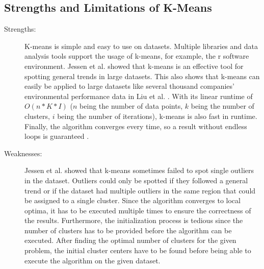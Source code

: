 \subsection{Strengths and Limitations of K-Means}
\begin{description}
    \item[Strengths:]
    K-means is simple and easy to use on datasets.
    Multiple libraries and data analysis tools support the usage of k-means, for example, the r software environment.
    Jessen et al. \cite{JES-IND} showed that k-means is an effective tool for spotting general trends in large datasets.
    This also shows that k-means can easily be applied to large datasets like several thousand companies' environmental performance data in Liu et al. \cite{LIU-BDE}.
    With its linear runtime of $O(n * K * I)$ ($n$ being the number of data points, $k$ being the number of clusters, $i$ being the number of iterations), k-means is also fast in runtime.
    Finally, the algorithm converges every time, so a result without endless loops is guaranteed \cite{SEL-GCT}.
    \item[Weaknesses:]
    Jessen et al. \cite{JES-IND} showed that k-means sometimes failed to spot single outliers in the dataset.
    Outliers could only be spotted if they followed a general trend or if the dataset had multiple outliers in the same region that could be assigned to a single cluster.
    Since the algorithm converges to local optima, it has to be executed multiple times to ensure the correctness of the results.
    Furthermore, the initialization process is tedious since the number of clusters has to be provided before the algorithm can be executed.
    After finding the optimal number of clusters for the given problem, the initial cluster centers have to be found before being able to execute the algorithm on the given dataset.

\end{description}
